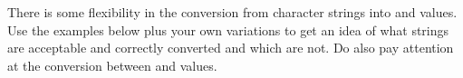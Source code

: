 \documentclass[krantz2]{krantz}\usepackage{knitr}%
\begin{document}
\begin{playground}
There is some flexibility in the conversion from character strings into  and  values. Use the examples below plus your own variations to get an idea of what strings are acceptable and correctly converted and which are not. Do also pay attention at the conversion between  and  values.

\begin{knitrout}\footnotesize
{}\color{fgcolor}\begin{kframe}
\begin{alltt}
\hlstd{(}\hlstd{)}
\hlstd{(}\hlstd{)}
\hlstd{(}\hlstd{)}
\hlstd{(}\hlstd{)}
\hlstd{(}\hlstd{)}
\hlstd{(}\hlstd{)}
\hlstd{(}\hlstd{)}
\hlstd{(}\hlstd{)}
\hlstd{(}\hlstd{)}
\hlstd{(}\hlstd{)}
\hlstd{(}\hlopt{-}\hlstd{)}
\end{alltt}
\end{kframe}
\end{knitrout}

\end{playground}
\end{document}
